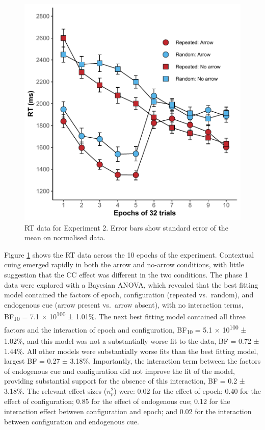 \documentclass[
  man,floatsintext]{apa7}
\begin{document}
\begin{figure}

{\centering \includegraphics{CCC_ms1_files/figure-latex/Exp2-RT-figure-1} 

}

\caption{RT data for Experiment 2. Error bars show standard error of the mean on normalised data.}\label{fig:Exp2-RT-figure}
\end{figure}



Figure \ref{fig:Exp2-RT-figure} shows the RT data across the 10 epochs of the experiment. Contextual cuing emerged rapidly in both the arrow and no-arrow conditions, with little suggestion that the CC effect was different in the two conditions. The phase 1 data were explored with a Bayesian ANOVA, which revealed that the best fitting model contained the factors of epoch, configuration (repeated vs.~random), and endogenous cue (arrow present vs.~arrow absent), with no interaction terms, BF\textsubscript{10} = 7.1 × 10\textsuperscript{100} ± 1.01\%. The next best fitting model contained all three factors and the interaction of epoch and configuration, BF\textsubscript{10} = 5.1 × 10\textsuperscript{100} ± 1.02\%, and this model was not a substantially worse fit to the data, BF = 0.72 ± 1.44\%. All other models were substantially worse fits than the best fitting model, largest BF = 0.27 ± 3.18\%. Importantly, the interaction term between the factors of endogenous cue and configuration did not improve the fit of the model, providing substantial support for the absence of this interaction, BF = 0.2 ± 3.18\%. The relevant effect sizes (\(n^2_p\)) were: 0.02 for the effect of epoch; 0.40 for the effect of configuration; 0.85 for the effect of endogenous cue; 0.12 for the interaction effect between configuration and epoch; and 0.02 for the interaction between configuration and endogenous cue.
\end{document}
